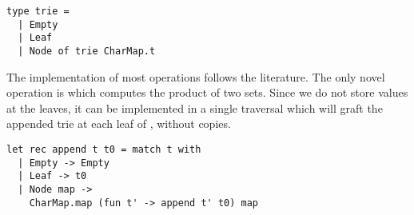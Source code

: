 \begin{lstlisting}
type trie =
  | Empty
  | Leaf
  | Node of trie CharMap.t
\end{lstlisting}

The implementation of most operations follows the literature.
The only novel operation is  which computes the product of two sets.
Since we do not store values at the leaves,
it can be implemented in a single traversal which will graft the appended trie
 at each leaf of , without copies.

\begin{lstlisting}
let rec append t t0 = match t with
  | Empty -> Empty
  | Leaf -> t0
  | Node map -> 
    CharMap.map (fun t' -> append t' t0) map
\end{lstlisting}

